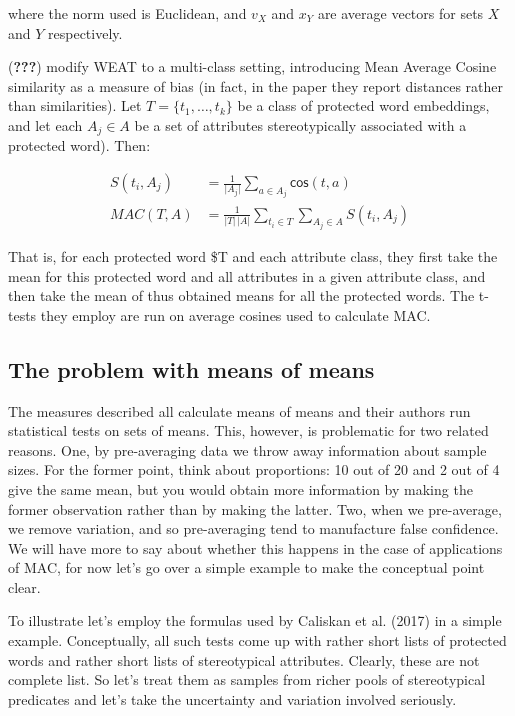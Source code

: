 \documentclass[10pt,dvipsnames,enabledeprecatedfontcommands]{scrartcl}
\begin{document}
\noindent where the norm used is Euclidean, and \(v_X\) and \(x_Y\) are
average vectors for sets \(X\) and \(Y\) respectively.

({\textbf{???}}) modify WEAT to a multi-class setting, introducing Mean
Average Cosine similarity as a measure of bias (in fact, in the paper
they report distances rather than similarities). Let
\(T = \{t_1, \dots, t_k\}\) be a class of protected word embeddings, and
let each \(A_j\in A\) be a set of attributes stereotypically associated
with a protected word). Then:

\begin{align}
S(t_i, A_j) & = \frac{1}{\vert A_j\vert}\sum_{a\in A_j}\mathsf{cos}(t,a) \\
MAC(T,A) & = \frac{1}{\vert T \vert \,\vert A\vert}\sum_{t_i \in T }\sum_{A_j \in A} S(t_i,A_j)
\end{align}

That is, for each protected word \$T and each attribute class, they
first take the mean for this protected word and all attributes in a
given attribute class, and then take the mean of thus obtained means for
all the protected words. The t-tests they employ are run on average
cosines used to calculate MAC.

\subsection{The problem with means of
means}\label{the-problem-with-means-of-means}

The measures described all calculate means of means and their authors
run statistical tests on sets of means. This, however, is problematic
for two related reasons. One, by pre-averaging data we throw away
information about sample sizes. For the former point, think about
proportions: 10 out of 20 and 2 out of 4 give the same mean, but you
would obtain more information by making the former observation rather
than by making the latter. Two, when we pre-average, we remove
variation, and so pre-averaging tend to manufacture false confidence. We
will have more to say about whether this happens in the case of
applications of MAC, for now let's go over a simple example to make the
conceptual point clear.

To illustrate let's employ the formulas used by Caliskan et al. (2017)
in a simple example. Conceptually, all such tests come up with rather
short lists of protected words and rather short lists of stereotypical
attributes. Clearly, these are not complete list. So let's treat them as
samples from richer pools of stereotypical predicates and let's take the
uncertainty and variation involved seriously.
\end{document}
